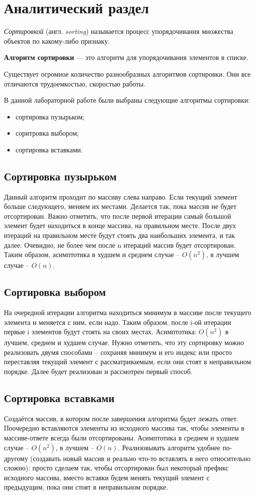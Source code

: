 \chapter{Аналитический раздел}

\textit{Сортировкой} (англ. \textit{sorting}) называется процесс упорядочивания множества объектов по какому-либо признаку.

\textbf{Алгоритм сортировки} — это алгоритм для упорядочивания элементов в списке.

Существует огромное количество разнообразных алгоритмов сортировки. Они все отличаются трудоемкостью, скоростью работы.

В данной лабораторной работе были выбраны следующие алгоритмы сортировки:

\begin{itemize}
	\item сортировка пузырьком;
	\item соритровка выбором;
	\item сортировка вставками.
\end{itemize}

\section{Сортировка пузырьком}
Данный алгоритм проходит по массиву слева направо. Если текущий элемент больше следующего, меняем их местами. Делается так, пока массив не будет отсортирован. Важно отметить, что после первой итерации самый большой элемент будет находиться в конце массива, на правильном месте. После двух итераций на правильном месте будут стоять два наибольших элемента, и так далее. Очевидно, не более чем после n итераций массив будет отсортирован. Таким образом, асимптотика в худшем и среднем случае – $O(n^2)$, в лучшем случае – $O(n)$.

\section{Сортировка выбором}
На очередной итерации алгоритма находиться минимум в массиве после текущего элемента и меняется с ним, если надо. Таким образом, после i-ой итерации первые i элементов будут стоять на своих местах. Асимптотика: $O(n^2)$ в лучшем, среднем и худшем случае. Нужно отметить, что эту сортировку можно реализовать двумя способами – сохраняя минимум и его индекс или просто переставляя текущий элемент с рассматриваемым, если они стоят в неправильном порядке. Далее будет реализован и рассмотрен первый способ.

\section{Сортировка вставками}
Создаётся массив, в котором после завершения алгоритма будет лежать ответ. Поочередно вставляются элементы из исходного массива так, чтобы элементы в массиве-ответе всегда были отсортированы. Асимптотика в среднем и худшем случае – $O(n^2)$, в лучшем – $O(n)$. Реализовывать алгоритм удобнее по-другому (создавать новый массив и реально что-то вставлять в него относительно сложно): просто сделаем так, чтобы отсортирован был некоторый префикс исходного массива, вместо вставки будем менять текущий элемент с предыдущим, пока они стоят в неправильном порядке.